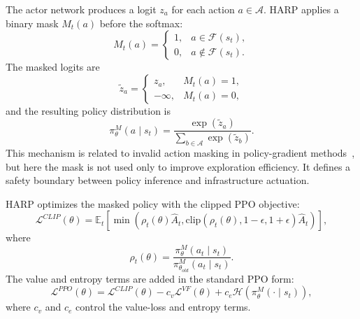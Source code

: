 \documentclass[final,5p]{elsarticle}
\begin{document}
The actor network produces a logit \(z_a\) for each action \(a \in \mathcal{A}\). HARP applies a binary mask \(M_t(a)\) before the softmax:
\begin{equation}
    M_t(a) =
    \begin{cases}
        1, & a \in \mathcal{F}(s_t), \\
        0, & a \notin \mathcal{F}(s_t).
    \end{cases}
\end{equation}
The masked logits are
\begin{equation}
    \tilde{z}_a =
    \begin{cases}
        z_a, & M_t(a)=1, \\
        -\infty, & M_t(a)=0,
    \end{cases}
\end{equation}
and the resulting policy distribution is
\begin{equation}
    \pi_{\theta}^{M}(a \mid s_t) =
    \frac{\exp(\tilde{z}_a)}
    {\sum_{b \in \mathcal{A}} \exp(\tilde{z}_b)}.
\end{equation}
This mechanism is related to invalid action masking in policy-gradient methods~\cite{huang2022closer}, but here the mask is not used only to improve exploration efficiency. It defines a safety boundary between policy inference and infrastructure actuation.

HARP optimizes the masked policy with the clipped PPO objective:
\begin{equation}
    \mathcal{L}^{CLIP}(\theta) =
    \mathbb{E}_t
    \left[
        \min
        \left(
            \rho_t(\theta)\hat{A}_t,
            \mathrm{clip}
            \left(
                \rho_t(\theta),
                1-\epsilon,
                1+\epsilon
            \right)
            \hat{A}_t
        \right)
    \right],
\end{equation}
where
\begin{equation}
    \rho_t(\theta) =
    \frac{\pi_{\theta}^{M}(a_t \mid s_t)}
    {\pi_{\theta_{old}}^{M}(a_t \mid s_t)}.
\end{equation}
The value and entropy terms are added in the standard PPO form:
\begin{equation}
    \mathcal{L}^{PPO}(\theta) =
    \mathcal{L}^{CLIP}(\theta)
    - c_v \mathcal{L}^{VF}(\theta)
    + c_e \mathcal{H}\left(\pi_{\theta}^{M}(\cdot \mid s_t)\right),
\end{equation}
where \(c_v\) and \(c_e\) control the value-loss and entropy terms.
\end{document}
